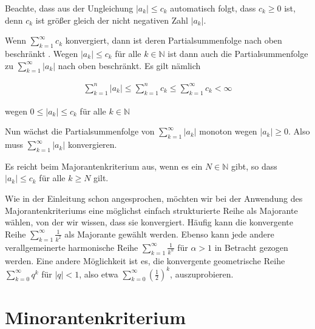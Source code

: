 \documentclass[fontsize=9pt,
               parskip=half-,
               DIV=14,
               listof=chapterentry,
               tocflat]{scrbook}
\begin{document}
\begin{explanation*}[Majorantenkriterium]
 Beachte, dass aus der Ungleichung $|a_{k}|\leq c_{k}$ automatisch folgt, dass $c_{k}\geq 0$ ist, denn $c_{k}$ ist größer gleich der nicht negativen Zahl $|a_{k}|$.

\end{explanation*}

\begin{proof*}[Majorantenkriterium]
Wenn $\sum _{k=1}^{\infty }c_{k}$ konvergiert, dann ist deren Partialsummenfolge nach oben beschränkt . Wegen $|a_{k}|\leq c_{k}$ für alle $k\in \mathbb {N} $ ist dann auch die Partialsummenfolge zu $\sum _{k=1}^{\infty }|a_{k}|$ nach oben beschränkt. Es gilt nämlich

\begin{align*}
\sum _{k=1}^{n}|a_{k}|\leq \sum _{k=1}^{n}c_{k}\leq \sum _{k=1}^{\infty }c_{k}<\infty 
\end{align*}

wegen $0\leq |a_{k}|\leq c_{k}$ für alle $k\in \mathbb {N} $

Nun wächst die Partialsummenfolge von $\sum _{k=1}^{\infty }|a_{k}|$ monoton wegen $|a_{k}|\geq 0$. Also muss $\sum _{k=1}^{\infty }|a_{k}|$ konvergieren. 

\end{proof*}

\begin{hint*}
Es reicht beim Majorantenkriterium aus, wenn es ein $N\in \mathbb {N} $ gibt, so dass $|a_{k}|\leq c_{k}$ für alle $k\geq N$ gilt.

\end{hint*}

\begin{hint*}
Wie in der Einleitung schon angesprochen, möchten wir bei der Anwendung des Majorantenkriteriums eine möglichst einfach strukturierte Reihe als Majorante wählen, von der wir wissen, dass sie konvergiert. Häufig kann die konvergente Reihe $\sum _{k=1}^{\infty }{\tfrac {1}{k^{2}}}$ als Majorante gewählt werden. Ebenso kann jede andere verallgemeinerte harmonische Reihe $\sum _{k=1}^{\infty }{\tfrac {1}{k^{\alpha }}}$ für $\alpha >1$ in Betracht gezogen werden. Eine andere Möglichkeit ist es, die konvergente geometrische Reihe $\sum _{k=0}^{\infty }q^{k}$ für $|q|<1$, also etwa $\sum _{k=0}^{\infty }\left({\tfrac {1}{2}}\right)^{k}$, auszuprobieren.

\end{hint*}

\section{Minorantenkriterium}
\end{document}

